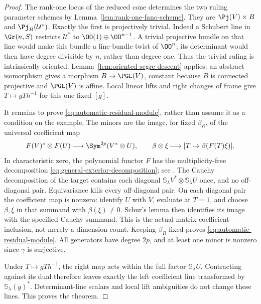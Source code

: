 \begin{proof}
The rank-one locus of the reduced cone determines the two ruling
parameter schemes by Lemma~\ref{lem:rank-one-fano-scheme}.  They are
\(\Pj(V)\times B\) and \(\Pj_B(\mathcal U^*)\).
Exactly the first is projectively trivial.  Indeed a Schubert line in
\(\Gr(n,S)\) restricts \(\mathcal U^*\) to
\(\OO(1)\oplus\OO^{n-1}\).  A trivial projective bundle on
that line would make this bundle a line-bundle twist of
\(\OO^n\); its determinant would then have degree divisible by
\(n\), rather than degree one.  Thus the trivial ruling is
intrinsically oriented.  Lemma~\ref{lem:oriented-segre-descent}
applies: an abstract isomorphism gives a morphism \(B\to\PGL(V)\),
constant because \(B\) is connected projective and \(\PGL(V)\)
is affine.  Local linear lifts and right changes of frame give
\(T\mapsto gTh^{-1}\) for this one fixed \([g]\).

It remains to prove \eqref{eq:automatic-residual-module}, rather
than assume it as a condition on the example.  The minors are the
image, for fixed \(\beta_R\), of the universal coefficient map
\begin{equation}\label{eq:general-coefficient-map}
 F(V)^*\otimes F(U)\longrightarrow
 \Sym^{2p}(V^*\otimes U),\qquad
 \beta\otimes\xi\longmapsto[T\mapsto\beta(F(T)\xi)].
\end{equation}
In characteristic zero, the polynomial functor \(F\) has the
multiplicity-free decomposition \eqref{eq:general-exterior-decomposition};
see \cite[Theorem~3.5]{ChengWang}.  The Cauchy decomposition of the
target contains each diagonal
\(\mathbb S_\lambda V^*\otimes\mathbb S_\lambda U\)
once, and no off-diagonal pair.  Equivariance kills every
off-diagonal pair.  On each diagonal pair the coefficient map is
nonzero: identify \(U\) with \(V\), evaluate at \(T=1\), and
choose \(\beta,\xi\) in that summand with
\(\beta(\xi)\ne0\).  Schur's lemma then identifies its image
with the specified Cauchy summand.  This is the actual matrix-coefficient
inclusion, not merely a dimension count.  Keeping \(\beta_R\)
fixed proves \eqref{eq:automatic-residual-module}.  All generators
have degree \(2p\), and at least one minor is nonzero since
\(\gamma\) is surjective.

Under \(T\mapsto gTh^{-1}\), the right map acts within the full
factor \(\mathbb S_\lambda U\).  Contracting against its dual
therefore leaves exactly the left coefficient line transformed by
\(\mathbb S_\lambda(g)^*\).  Determinant-line scalars and local
lift ambiguities do not change these lines.  This proves the theorem.
\end{proof}

